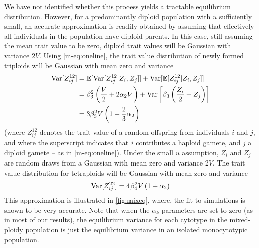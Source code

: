 \documentclass[11pt,a4paper]{article}
\begin{document}
We have not identified whether this process yields a tractable equilibrium
distribution. However, for a predominantly diploid population with $u$
sufficiently small, an accurate approximation is readily obtained by assuming
that effectively all individuals in the population have diploid parents.
In this case, still assuming the mean trait value to be zero, diploid trait
values will be Gaussian with variance $2V$.
Using \cref{m-eq:oneline}, the trait value distribution of newly formed triploids
will be Gaussian with mean zero and variance
\begin{align*}
  \mathrm{Var}[Z_{ij}^{12}] 
    &= \mathbb{E}[\mathrm{Var}[Z_{ij}^{12}|Z_i,Z_j]] + \mathrm{Var}[\mathbb{E}[Z_{ij}^{12}|Z_i,Z_j]] \\
    &= \beta_3^2\left(\frac{V}{2} + 2\alpha_2 V\right) +
    \mathrm{Var}\left[\beta_3\left(\frac{Z_i}{2} + Z_j\right)\right] \\
    &= 3\beta_3^2V\left(1 + \frac{2}{3}\alpha_2\right)
\end{align*}
(where $Z_{ij}^{12}$ denotes the trait value of a random offspring from
individuals $i$ and $j$, and where the superscript indicates that $i$
contributes a haploid gamete, and $j$ a diploid gamete -- as in
\cref{m-eq:oneline}).
Under the small $u$ assumption, $Z_i$ and $Z_j$ are random draws from a
Gaussian with mean zero and variance $2V$.
The trait value distribution for tetraploids will be Gaussian with mean zero
and variance
  $$\mathrm{Var}[Z_{ij}^{22}] = 4\beta_4^2V\left(1 + \alpha_2\right)$$
This approximation is illustrated in \cref{fig:mixeq}, where, the fit to
simulations is shown to be very accurate.
Note that when the $\alpha_k$ parameters are set to zero (as in most of our
results), the equilibrium variance for each cytotype in the mixed-ploidy
population is just the equilibrium variance in an isolated monocytotypic
population.







\end{document}
